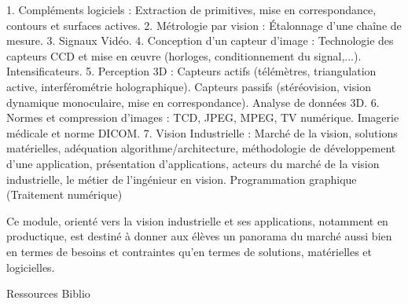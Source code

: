 {
1.	Compléments logiciels : Extraction de primitives, mise en correspondance, contours et surfaces actives.
2.	Métrologie par vision : Étalonnage d'une chaîne de mesure.
3.	Signaux Vidéo.
4.	Conception d'un capteur d'image : Technologie des capteurs CCD et mise en \oe uvre (horloges, conditionnement du signal,...). Intensificateurs.
5.	Perception 3D : Capteurs actifs (télémètres, triangulation active, interférométrie holographique). Capteurs passifs (stéréovision, vision dynamique monoculaire, mise en correspondance). Analyse de données 3D.
6.	Normes et compression d'images : TCD, JPEG, MPEG, TV numérique. Imagerie médicale et norme DICOM.
7.	Vision Industrielle : Marché de la vision, solutions matérielles, adéquation algorithme/architecture, méthodologie de développement d'une application, présentation d'applications, acteurs du marché de la vision industrielle, le métier de l'ingénieur en vision. 
} 
{Programmation graphique (Traitement numérique)} 
{\begin{itemize}
\ObjItem Ce module, orienté vers la vision industrielle et ses applications, notamment en productique, est destiné à donner aux élèves un panorama du marché aussi bien en termes de besoins et contraintes qu'en termes de solutions, matérielles et logicielles.
\end{itemize} 
} 
{Ressources} 
{Biblio} 
 
\vfill

